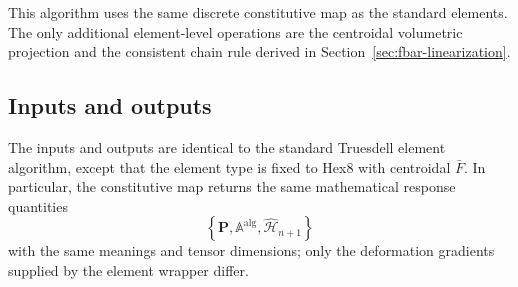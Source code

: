 \documentclass[11pt,a4paper]{article}
\newcommand{\bs}[1]{\boldsymbol{#1}}
\newcommand{\Pstress}{\bs{P}}
\newcommand{\Aalg}{\mathbb{A}^{\mathrm{alg}}}
\begin{document}
This algorithm uses the same discrete constitutive map as the standard elements. The only additional element-level operations are the centroidal volumetric projection and the consistent chain rule derived in Section~\ref{sec:fbar-linearization}.

\subsection*{Inputs and outputs}
The inputs and outputs are identical to the standard Truesdell element algorithm, except that the element type is fixed to Hex8 with centroidal $\bar F$. In particular, the constitutive map returns the same mathematical response quantities
\begin{equation}
\left\{\Pstress,\Aalg,\widehat{\mathcal H}_{n+1}\right\}
\end{equation}
with the same meanings and tensor dimensions; only the deformation gradients supplied by the element wrapper differ.
\end{document}
